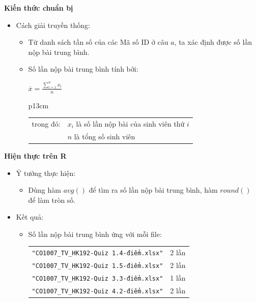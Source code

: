 \documentclass[a4paper]{article}
\theoremstyle{definition}
\begin{document}
\begin{enumerate}[a)]
    \bf Kiến thức chuẩn bị\normalfont
    \begin{itemize}
        \item Cách giải truyền thống:
        \begin{itemize}
            \item Từ danh sách tần số của các Mã số ID ở câu $a$, ta xác định được số lần nộp bài trung bình.
            \item Số lần nộp bài trung bình tính bởi:
            \begin{center}
                $\overline{x} = \frac{\sum\limits_{i = 1}^n x_i}{n}$
            \end{center}
            \begin{tabular}{p{13cm}}
                \begin{tabular}{l l}
                     trong đó: & $x_i$ là số lần nộp bài của sinh viên thứ $i$\\
                     & $n$ là tổng số sinh viên
                \end{tabular}
            \end{tabular}
        \end{itemize}
    \end{itemize}
    \bf Hiện thực trên R\normalfont
    \begin{itemize}
        \item Ý tưởng thực hiện:
        \begin{itemize}
            \item Dùng hàm $avg()$ để tìm ra số lần nộp bài trung bình, hàm $round()$ để làm tròn số.
        \end{itemize}
        \item Kết quả:
        \begin{itemize}
            \item Số lần nộp bài trung bình ứng với mỗi file:
            \begin{center}
                \begin{tabular}{l l}
                     \texttt{"CO1007\_TV\_HK192-Quiz 1.4-điểm.xlsx"} & 2 lần\\ 
                     \texttt{"CO1007\_TV\_HK192-Quiz 1.5-điểm.xlsx"} & 2 lần\\ 
                     \texttt{"CO1007\_TV\_HK192-Quiz 3.3-điểm.xlsx"} & 1 lần\\ 
                     \texttt{"CO1007\_TV\_HK192-Quiz 4.2-điểm.xlsx"} & 2 lần\\ 
                \end{tabular}

\end{center}
\end{itemize}
\end{itemize}
\end{enumerate}
\end{document}
